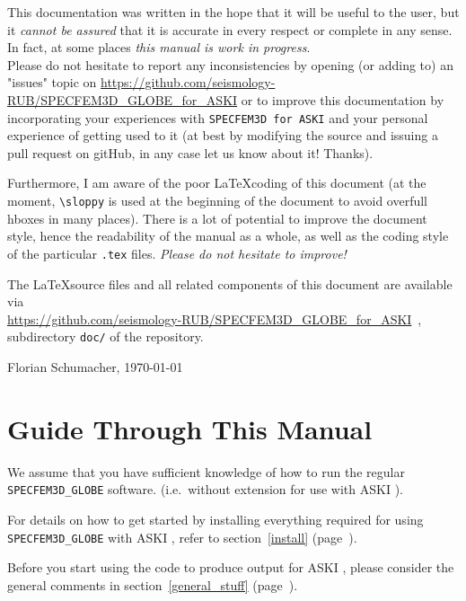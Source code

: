 \documentclass[12pt,a4paper]{article}
\newcommand{\lcode}[1]{\nolinkurl{#1}}
\newcommand{\ASKI}{ {\ttfamily ASKI} }
\newcommand{\myref}[1]{\ref{#1} (page~\pageref{#1})}
\begin{document}
\vspace{1em}

This documentation was written in the hope that it will be useful to the user,
but it \emph{cannot be assured} that it is accurate in every respect or complete in any sense.
In fact, at some places \emph{this manual is work in progress}.\\
Please do not hesitate to report any inconsistencies by
opening (or adding to) an "issues" topic on \url{https://github.com/seismology-RUB/SPECFEM3D_GLOBE_for_ASKI}
or to improve this documentation by incorporating your experiences with \lcode{SPECFEM3D for ASKI} 
and your personal experience of getting used to it (at best by modifying the source and issuing a pull request
on gitHub, in any case let us know about it! Thanks).

Furthermore, I am aware of the poor \LaTeX coding of this document (at the moment, \verb+\sloppy+ is used
at the beginning of the document to avoid overfull hboxes in many places). There is a lot of potential
to improve the document 
style, hence the readability of the manual as a whole, as well as the coding style of the 
particular \lcode{.tex} files. \emph{Please do not hesitate to improve!}

The \LaTeX source files and all related components of this document are available via\\
\url{https://github.com/seismology-RUB/SPECFEM3D_GLOBE_for_ASKI}~, subdirectory 
\lcode{doc/} of the repository.
\begin{flushright}
Florian Schumacher, \mydate \today
\end{flushright}

\newpage
%
\section*{Guide Through This Manual}
%
We assume that you have sufficient knowledge of how to run the regular \lcode{SPECFEM3D_GLOBE} software.
(i.e.\ without extension for use with \ASKI{}).

For details on how to get started by installing everything required for using \lcode{SPECFEM3D_GLOBE} 
with \ASKI{}, refer to section~\myref{install}{}. 

Before you start using the code to produce output for \ASKI{}, please consider the general
comments in section~\myref{general_stuff}.
\end{document}
